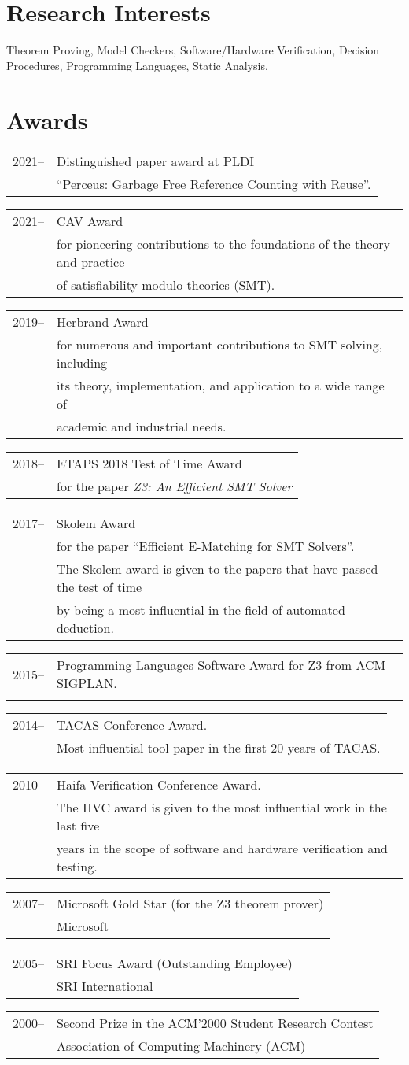 \documentclass{article}
\newcommand{\job}[4]{\begin{flushleft}
                                        \begin{tabular}{ll}
                                         #1-- & #3 \\
                     #2 & #4 \\
                    \end{tabular}
                                        \end{flushleft}
                    }
\newcommand{\award}[4]{\job{#1}{#2}{#3}{#4}}
\begin{document}
\section*{Research Interests}

Theorem Proving, Model Checkers, Software/Hardware Verification, Decision Procedures, Programming Languages, Static Analysis.

\section*{Awards}

\award{2021}{ }{Distinguished paper award at PLDI}{“Perceus: Garbage Free Reference Counting with Reuse”.}
\award{2021}{ }{CAV Award}{for pioneering contributions to the foundations of the theory and practice\\ & of satisfiability modulo theories (SMT).}
\award{2019}{ }{Herbrand Award}{for numerous and important contributions to SMT solving, including\\ & its theory, implementation, and application to a wide range of \\ & academic and industrial needs.}
\award{2018}{ }{ETAPS 2018 Test of Time Award}{for the paper {\em Z3: An Efficient SMT Solver}}
\award{2017}{ }{Skolem Award}
      {for the paper ``Efficient E-Matching for SMT Solvers''. \\
       & The Skolem award is given to the papers that have passed the test of time \\
       & by being a most influential in the field of automated deduction.}
\award{2015}{ }{Programming Languages Software Award for Z3 from ACM SIGPLAN.}{}
\award{2014}{ }{TACAS Conference Award. }  { Most influential tool paper in the first 20 years of TACAS.}
\award{2010}{ }{Haifa Verification Conference Award. } { The HVC award is given to the most influential work in the last five \\
                   & years in the scope of software and hardware verification and testing. }
\award{2007}{ }{Microsoft Gold Star (for the Z3 theorem prover)}{Microsoft}
\award{2005}{ }{SRI Focus Award (Outstanding Employee)}{SRI International}
\award{2000}{ }{Second Prize in the ACM'2000 Student Research Contest}{Association of Computing Machinery (ACM)}
\end{document}
